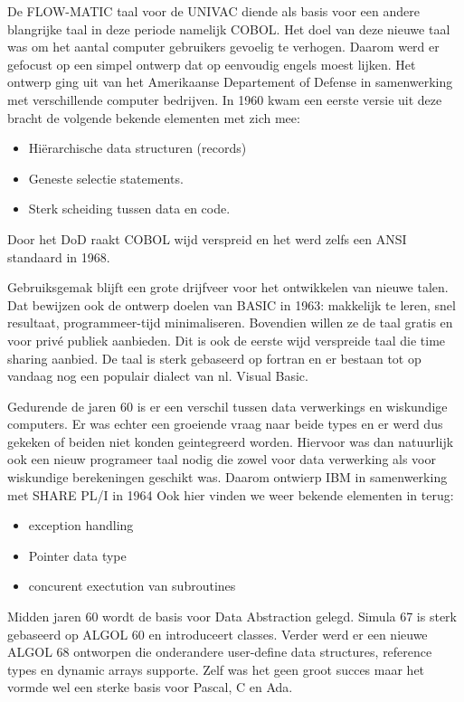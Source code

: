 \documentclass[../main.tex]{subfiles}
\begin{document}
\begin{solution}
De FLOW-MATIC taal voor de UNIVAC diende als basis voor een andere blangrijke taal in deze periode namelijk COBOL.
Het doel van deze nieuwe taal was om het aantal computer gebruikers gevoelig te verhogen.
Daarom werd er gefocust op een simpel ontwerp dat op eenvoudig engels moest lijken.
Het ontwerp ging uit van het Amerikaanse Departement of Defense in samenwerking met verschillende computer bedrijven.
In 1960 kwam een eerste versie uit deze bracht de volgende bekende elementen met zich mee:
\begin{itemize}
		\item Hi\"erarchische data structuren (records)
		\item Geneste selectie statements.
		\item Sterk scheiding tussen data en code.
\end{itemize}
Door het DoD raakt COBOL wijd verspreid en het werd zelfs een ANSI standaard in 1968.

Gebruiksgemak blijft een grote drijfveer voor het ontwikkelen van nieuwe talen.
Dat bewijzen ook de ontwerp doelen van BASIC in 1963: makkelijk te leren, snel resultaat, programmeer-tijd minimaliseren.
Bovendien willen ze de taal gratis en voor priv\'e publiek aanbieden.
Dit is ook de eerste wijd verspreide taal die time sharing aanbied.
De taal is sterk gebaseerd op fortran en er bestaan tot op vandaag nog een populair dialect van nl. Visual Basic.

Gedurende de jaren 60 is er een verschil tussen data verwerkings en wiskundige computers.
Er was echter een groeiende vraag naar beide types en er werd dus gekeken of beiden niet konden geintegreerd worden.
Hiervoor was dan natuurlijk ook een nieuw programeer taal nodig die zowel voor data verwerking als voor wiskundige berekeningen geschikt was.
Daarom ontwierp IBM in samenwerking met SHARE PL/I in 1964
Ook hier vinden we weer bekende elementen in terug:
\begin{itemize}
	\item exception handling
	\item Pointer data type
	\item concurent exectution van subroutines
\end{itemize}

Midden jaren 60 wordt de basis voor Data Abstraction gelegd.
Simula 67 is sterk gebaseerd op ALGOL 60 en introduceert classes.
Verder werd er een nieuwe ALGOL 68 ontworpen die onderandere user-define data structures, reference types en dynamic arrays supporte.
Zelf was het geen groot succes maar het vormde wel een sterke basis voor Pascal, C en Ada.


\end{solution}
\end{document}

